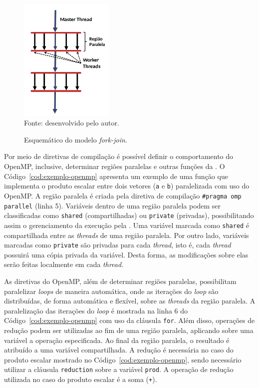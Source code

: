 \begin{figure}[t]
	\centering
	\caption{Esquemático do modelo \textit{fork-join}.}
	\includegraphics[width=0.4\textwidth]{figs/forkjoin.pdf} \\
    Fonte: desenvolvido pelo autor.
	\label{fig:forkjoin}
\end{figure}

Por meio de diretivas de compilação é possível definir o comportamento do
OpenMP, inclusive, determinar regiões paralelas e outras funções da \api.
O Código~\ref{cod:exemplo-openmp} apresenta um exemplo de uma função
que implementa o produto escalar entre dois vetores (\texttt{a} e \texttt{b}) paralelizada
com uso do OpenMP. A região paralela é criada pela diretiva de compilação
\texttt{\#pragma omp parallel} (linha 5). Variáveis dentro de uma região paralela
podem ser classificadas como \texttt{shared} (compartilhadas) ou \texttt{private} (privadas),
possibilitando assim o gerenciamento da execução pela \api. Uma variável marcada como \texttt{shared}
é compartilhada entre as \textit{threads} de uma região paralela. Por outro lado, variáveis marcadas
como \texttt{private} são privadas para cada \textit{thread}, isto é, cada \textit{thread} possuirá uma
cópia privada da variável. Desta forma, as modificações sobre elas serão feitas localmente em cada
\textit{thread}.

As diretivas do OpenMP, além de determinar regiões paralelas, possibilitam
paralelizar \textit{loops} de maneira automática, onde as iterações
do \textit{loop} são distribuídas, de forma automática e flexível, sobre as
\textit{threads} da região paralela. A paralelização das iterações do \textit{loop} é mostrada na linha 6 do
Código~\ref{cod:exemplo-openmp} com uso da cláusula \texttt{for}. Além disso, operações de redução podem ser
utilizadas ao fim de uma região paralela, aplicando sobre uma variável a
operação especificada. Ao final da região paralela, o resultado é atribuído a uma variável compartilhada. A redução
é necessária no caso do produto escalar mostrado no Código~\ref{cod:exemplo-openmp}, sendo necessário
utilizar a cláusula \texttt{reduction} sobre a variável \texttt{prod}. A operação de redução utilizada no caso do produto
escalar é a soma (\texttt{+}).

